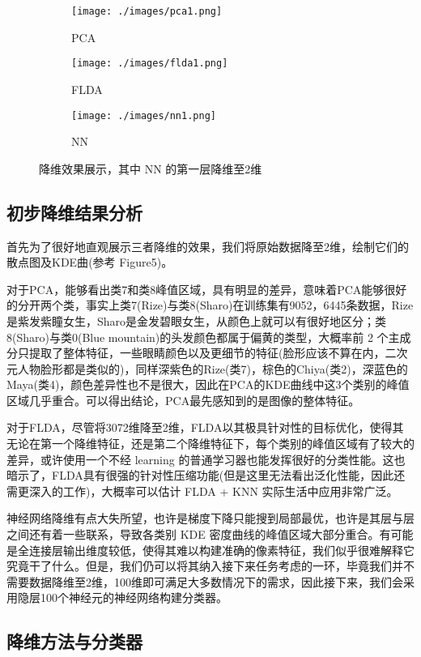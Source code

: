 \documentclass[fleqn]{Paquetes/RevDigMatEduInt}
\begin{document}
\begin{figure*}
	\centering
	\begin{subfigure}{0.315\textwidth}
		\texttt{[image: ./images/pca1.png]}
		\caption{PCA}
	\end{subfigure}
	\begin{subfigure}{0.315\textwidth}
		\texttt{[image: ./images/flda1.png]}
		\caption{FLDA}
	\end{subfigure}
	\begin{subfigure}{0.315\textwidth}
		\texttt{[image: ./images/nn1.png]}
		\caption{NN}
	\end{subfigure}
	\caption{降维效果展示，其中 NN 的第一层降维至2维}
\end{figure*}
\subsection{初步降维结果分析}


首先为了很好地直观展示三者降维的效果，我们将原始数据降至2维，绘制它们的散点图及KDE曲\cite{5}(参考 Figure5)。

对于PCA，能够看出类7和类8峰值区域，具有明显的差异，意味着PCA能够很好的分开两个类，事实上类7(Rize)与类8(Sharo)在训练集有9052，6445条数据，Rize是紫发紫瞳女生，Sharo是金发碧眼女生，从颜色上就可以有很好地区分；类8(Sharo)与类0(Blue mountain)的头发颜色都属于偏黄的类型，大概率前 2 个主成分只提取了整体特征，一些眼睛颜色以及更细节的特征(脸形应该不算在内，二次元人物脸形都是类似的)，同样深紫色的Rize(类7)，棕色的Chiya(类2)，深蓝色的Maya(类4)，颜色差异性也不是很大，因此在PCA的KDE曲线中这3个类别的峰值区域几乎重合。可以得出结论，PCA最先感知到的是图像的整体特征。

对于FLDA，尽管将3072维降至2维，FLDA以其极具针对性的目标优化，使得其无论在第一个降维特征，还是第二个降维特征下，每个类别的峰值区域有了较大的差异，或许使用一个不经 learning 的普通学习器也能发挥很好的分类性能。这也暗示了，FLDA具有很强的针对性压缩功能(但是这里无法看出泛化性能，因此还需更深入的工作)，大概率可以估计 FLDA + KNN 实际生活中应用非常广泛。

神经网络降维有点大失所望，也许是梯度下降只能搜到局部最优，也许是其层与层之间还有着一些联系，导致各类别 KDE 密度曲线的峰值区域大部分重合。有可能是全连接层输出维度较低，使得其难以构建准确的像素特征，我们似乎很难解释它究竟干了什么。但是，我们仍可以将其纳入接下来任务考虑的一环，毕竟我们并不需要数据降维至2维，100维即可满足大多数情况下的需求，因此接下来，我们会采用隐层100个神经元的神经网络构建分类器。

\subsection{降维方法与分类器}
\end{document}
